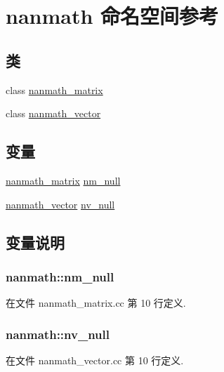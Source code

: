 \hypertarget{namespacenanmath}{}\section{nanmath 命名空间参考}
\label{namespacenanmath}
\subsection*{类}
\begin{DoxyCompactItemize}
\item 
class \hyperlink{classnanmath_1_1nanmath__matrix}{nanmath\+\_\+matrix}
\item 
class \hyperlink{classnanmath_1_1nanmath__vector}{nanmath\+\_\+vector}
\end{DoxyCompactItemize}
\subsection*{变量}
\begin{DoxyCompactItemize}
\item 
\hyperlink{classnanmath_1_1nanmath__matrix}{nanmath\+\_\+matrix} \hyperlink{namespacenanmath_a9c0de52dbad8862e49038ed1db9f70a1}{nm\+\_\+null}
\item 
\hyperlink{classnanmath_1_1nanmath__vector}{nanmath\+\_\+vector} \hyperlink{namespacenanmath_a72a622e555a21df499397344dc000321}{nv\+\_\+null}
\end{DoxyCompactItemize}


\subsection{变量说明}
\hypertarget{namespacenanmath_a9c0de52dbad8862e49038ed1db9f70a1}{}
\subsubsection[{nm\+\_\+null}]{ nanmath\+::nm\+\_\+null}\label{namespacenanmath_a9c0de52dbad8862e49038ed1db9f70a1}


在文件 nanmath\+\_\+matrix.\+cc 第 10 行定义.

\hypertarget{namespacenanmath_a72a622e555a21df499397344dc000321}{}
\subsubsection[{nv\+\_\+null}]{ nanmath\+::nv\+\_\+null}\label{namespacenanmath_a72a622e555a21df499397344dc000321}


在文件 nanmath\+\_\+vector.\+cc 第 10 行定义.


